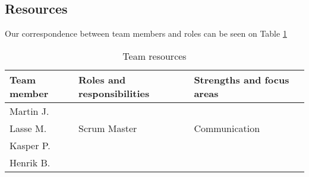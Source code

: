 
\subsection{Resources}
Our correspondence between team members and roles can be seen on Table 
\ref{tab:resources}


\begin{table}[!ht]
    \centering
    \begin{tabular}{l|l|l}
        \rowcolor{Gray}
        \textbf{Team member} & \textbf{Roles and responsibilities} & \textbf{Strengths and focus areas}\\\hline
        Martin J.            &&\\
        Lasse M.             & Scrum Master & Communication\\
        Kasper P.            & &\\
        Henrik B.            & &
    \end{tabular}
    \caption{Team resources}
    \label{tab:resources}
\end{table}


